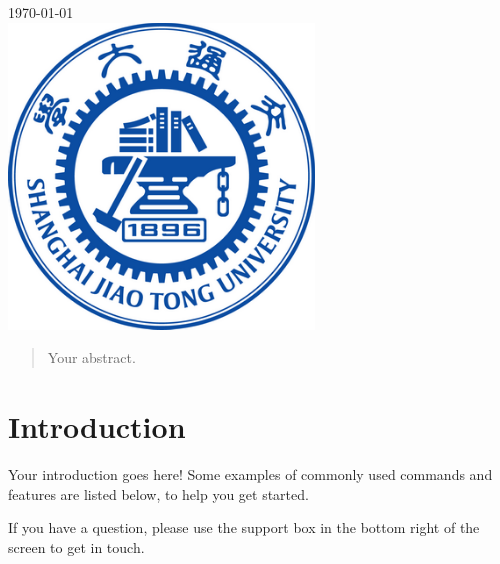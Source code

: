 \begin{titlepage}

{\large \today}\\[2cm] %


\includegraphics[width=3.2in, height=3.2in]{logo.png}\\[1cm] %
 

\vfill %

\end{titlepage}


\begin{abstract}
Your abstract.
\end{abstract}

\section{Introduction}

Your introduction goes here! Some examples of commonly used commands and features are listed below, to help you get started.

If you have a question, please use the support box in the bottom right of the screen to get in touch. 

